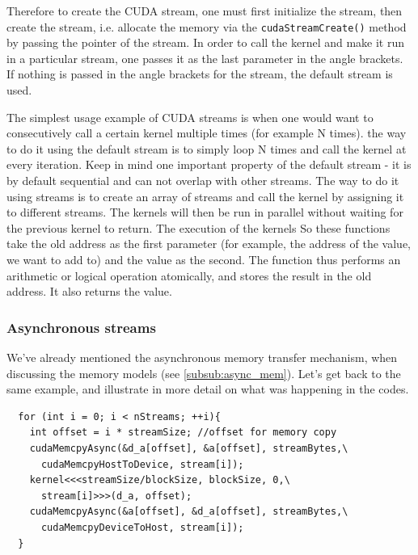Therefore to create the CUDA stream, one must first initialize the stream, then create the stream, i.e. 
allocate the memory via the \verb|cudaStreamCreate()| method by passing the pointer of the stream. 
In order to call the kernel and make it run in a particular stream, one passes it as the last parameter in the angle brackets.
If nothing is passed in the angle brackets for the stream, the default stream is used.

The simplest usage example of CUDA streams is when one would want to consecutively call a certain kernel multiple times 
(for example N times). 
the way to do it using the default stream is to simply loop N times and call the kernel at every iteration.
Keep in mind one important property of the default stream - it is by default sequential and can not overlap with other streams.
The way to do it using streams is to create an array of streams and call the kernel by assigning it to different streams.
The kernels will then be run in parallel without waiting for the previous kernel to return. The execution of the kernels 
So these functions take the old address as the first parameter (for example, the address of the value, we want to add to) and 
the value as the second. The function thus performs an arithmetic or logical operation atomically, 
and stores the result in the old address. It also returns the value.


\subsubsection{Asynchronous streams}
\label{subsub:async_streams}

We've already mentioned the asynchronous memory transfer mechanism, when discussing the memory models (see \ref{subsub:async_mem}).
Let's get back to the same example, and illustrate in more detail on what was happening in the codes.
\begin{listing}
  \begin{verbatim}
  for (int i = 0; i < nStreams; ++i){
    int offset = i * streamSize; //offset for memory copy 
    cudaMemcpyAsync(&d_a[offset], &a[offset], streamBytes,\
      cudaMemcpyHostToDevice, stream[i]);
    kernel<<<streamSize/blockSize, blockSize, 0,\
      stream[i]>>>(d_a, offset);
    cudaMemcpyAsync(&a[offset], &d_a[offset], streamBytes,\
      cudaMemcpyDeviceToHost, stream[i]);
  }
  \end{verbatim}
  \label{fig:async_mem_streams}
\end{listing}

